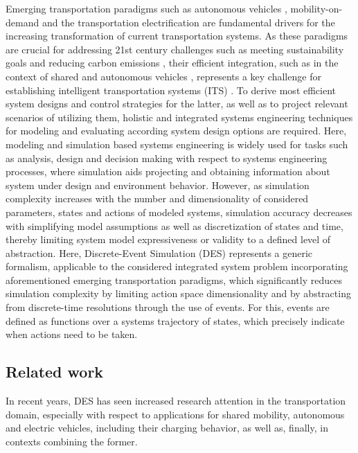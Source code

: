 \documentclass[graybox]{svmult}
\begin{document}
Emerging transportation paradigms such as autonomous vehicles \cite{hancock2019future}, mobility-on-demand \cite{atasoy2015concept} and the transportation electrification \cite{pereirinha2018main} are fundamental drivers for the increasing transformation of current transportation systems. As these paradigms are crucial for addressing 21st century challenges such as meeting sustainability goals and reducing carbon emissions \cite{sachs2019six}, their efficient integration, such as in the context of shared and autonomous vehicles \cite{narayanan2020shared}, represents a key challenge for establishing intelligent transportation systems (ITS) \cite{figueiredo2001towards}. To derive most efficient system designs and control strategies for the latter, as well as to project relevant scenarios of utilizing them, holistic and integrated systems engineering techniques for modeling and evaluating according system design options are required.
Here, modeling and simulation based systems engineering \cite{gianni2014modeling} is widely used for tasks such as analysis, design and decision making with respect to systems engineering processes, where simulation aids projecting and obtaining information about system under design and environment behavior.
However, as simulation complexity increases with the number and dimensionality of considered parameters, states and actions of modeled systems, simulation accuracy decreases with simplifying model assumptions as well as discretization of states and time, thereby limiting system model expressiveness or validity to a defined level of abstraction.
Here, Discrete-Event Simulation (DES) \cite{fishman2001discrete} represents a generic formalism, applicable to the considered integrated system problem incorporating aforementioned emerging transportation paradigms, which significantly reduces simulation complexity by limiting action space dimensionality and by abstracting from discrete-time resolutions through the use of events. For this, events are defined as functions over a systems trajectory of states, which precisely indicate when actions need to be taken. 

\subsection{Related work}
In recent years, DES has seen increased research attention in the transportation domain, especially with respect to applications for shared mobility, autonomous and electric vehicles, including their charging behavior, as well as, finally, in contexts combining the former.
\end{document}
